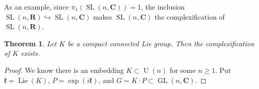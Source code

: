 \documentclass{article}
\DeclareMathOperator{\GL}{GL}
\DeclareMathOperator{\Lie}{Lie}
\DeclareMathOperator{\SL}{SL}
\DeclareMathOperator{\U}{U}
\newcommand{\bC}{{\mathbf C}}
\newcommand{\bR}{{\mathbf R}}
\newcommand{\fk}{{\mathfrak k}}
\newtheorem{theorem}{Theorem}
\theoremstyle{definition}
\begin{document}
As an example, since $\pi_1(\SL(n,\bC))=1$, the inclusion 
$\SL(n,\bR)\hookrightarrow \SL(n,\bC)$ makes $\SL(n,\bC)$ the complexification 
of $\SL(n,\bR)$. 

\begin{theorem}
Let $K$ be a compact connected Lie group. Then the complexification of $K$ 
exists. 
\end{theorem}
\begin{proof}
We know there is an embedding $K\subset \U(n)$ for some $n\geqslant 1$. Put 
$\fk=\Lie(K)$, $P=\exp(i \fk)$, and $G=K\cdot P\subset \GL(n,\bC)$. 
\end{proof}
\end{document}
